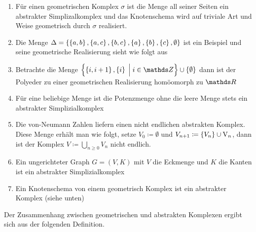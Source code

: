 \begin{Bsp}
  \begin{enumerate}[\textbullet]
  \item Für einen geometrischen Komplex $\sigma$ ist die Menge all
    seiner Seiten ein abstrakter Simplizalkomplex und das Knotenschema
    wird auf triviale Art und Weise geometrisch durch $\sigma$
    realisiert.
  \item Die Menge $\Delta = \sset{%
      \sset{a,b},\sset{a,c},%
      \sset{b,c},\sset{a},\sset{b},\sset{c},\emptyset}$ ist ein Beispiel und 
    seine geometrische Realisierung sieht wie folgt aus
    \begin{center}
    \end{center}

  \item Betrachte die Menge
    $\set{ \sset{i,i+1} , \sset{i} }{ i \in \Z} \cup \sset{\emptyset}$
    dann ist der Polyeder zu einer geometrischen Realisierung
    homöomorph zu $\R$

  \item Für eine beliebige Menge ist die Potenzmenge ohne die leere
    Menge stets ein abstrakter Simplizialkomplex
  \item Die von-Neumann Zahlen liefern einen nicht endlichen
    abstrakten Komplex.  Diese Menge erhält man wie folgt, setze
    $V_0 \coloneqq \emptyset$ und
    $V_{n+1} \coloneqq \left\{ V_n \right\} \cup \operatorname{V}_n$, dann ist der Komplex
    $V \coloneqq \bigcup\limits_{n \geq 0} V_n$ nicht endlich.
  \item Ein ungerichteter Graph $G=(V,K)$ mit $V$ die Eckmenge und $K$
    die Kanten ist ein abstrakter Simplizialkomplex
  \item Ein Knotenschema von einem geometrisch Komplex ist ein
    abstrakter Komplex (siehe unten)
  \end{enumerate}
\end{Bsp}


Der Zusammenhang zwischen geometrischen und abstrakten Komplexen ergibt sich 
aus der folgenden Definition.

\begin{Def}[Knotenschema]
\end{Def}

